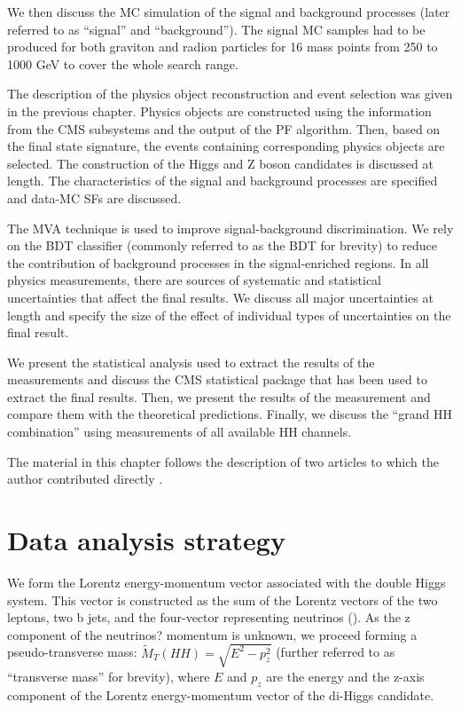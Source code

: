 We then discuss the MC simulation of the signal and background processes (later referred to as ``signal'' and ``background''). The signal MC samples had to be produced for both graviton and radion particles for 16 mass points from 250 to 1000 GeV to cover the whole search range. 

The description of the physics object reconstruction and event selection was given in the previous chapter. Physics objects are constructed using the information from the CMS subsystems and the output of the PF algorithm. Then, based on the final state signature, the events containing corresponding physics objects are selected. The construction of the Higgs and Z boson candidates is discussed at length. The characteristics of the signal and background processes are specified and data-MC SFs are discussed.

The MVA technique is used to improve signal-background discrimination. We rely on the BDT classifier (commonly referred to as the BDT for brevity) to reduce the contribution of background processes in the signal-enriched regions. In all physics measurements, there are sources of systematic and statistical uncertainties that affect the final results. We discuss all major uncertainties at length and specify the size of the effect of individual types of uncertainties on the final result. 

We present the statistical analysis used to extract the results of the measurements and discuss the CMS statistical package that has been used to extract the final results. Then, we present the results of the measurement and compare them with the theoretical predictions. Finally, we discuss the ``grand HH combination'' using measurements of all available HH channels.

The material in this chapter follows the description of two articles to which the author contributed directly \cite{bbZZAN, CMS-PAS-HIG-17-032}.

\section{Data analysis strategy}
\label{sec:strategy}
We form the Lorentz energy-momentum vector associated with the double Higgs system. This vector is constructed as the sum of the Lorentz vectors of the two leptons, two b jets, and the four-vector representing neutrinos (\PTslash). As the z component of the neutrinos? momentum is unknown, we proceed forming a pseudo-transverse mass:
$\tilde{M}_T(HH) = \sqrt{E^2 - p_{z}^2}$ (further referred to as ``transverse mass'' for brevity), where $E$ and $p_z$ are the energy and the z-axis component of the Lorentz energy-momentum vector of the di-Higgs candidate.

